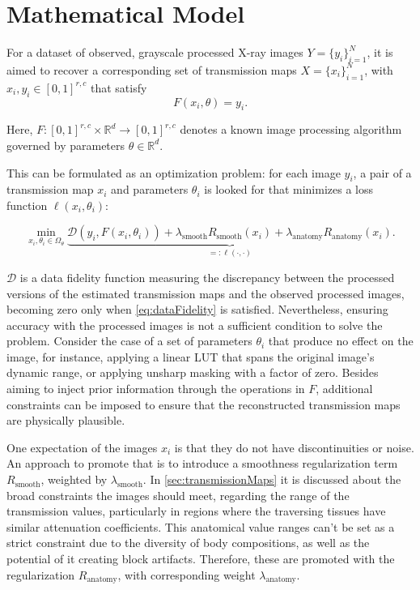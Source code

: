 \documentclass[nomenclature, english, bibtex]{kththesis}
\numberwithin{listing}{chapter}
\begin{document}
\section{Mathematical Model}
\label{sec:mathematicalModel}

For a dataset of observed, grayscale processed X-ray images $Y = \{y_i\}^N_{i=1}$, it is aimed to recover a corresponding
set of transmission maps $X = \{x_i\}^N_{i=1}$, with $x_i, y_i \in [0, 1]^{r, c}$ that satisfy
\begin{equation}
    \label{eq:dataFidelity}
    F(x_i, \theta) = y_i.
\end{equation}

Here, $F:[0,1]^{r, c} \times \mathbb{R}^d \to [0, 1]^{r, c}$ denotes a known image processing algorithm governed by
parameters $\theta \in \mathbb{R}^d$.

This can be formulated as an optimization problem: for each image $y_i$, a pair of a transmission map $x_i$ and parameters $\theta_i$ is looked for that minimizes a loss function $\ell(x_i, \theta_i)$:

\begin{equation}
    \label{eq:optimizationProblem}
    \min_{x_i, \theta_i \in \Omega_\theta}  \underbrace{\mathcal{D}(y_i, F(x_i, \theta_i)) + \lambda_{\text{smooth}} R_{\text{smooth}}(x_i) + \lambda_{\text{anatomy}} R_{\text{anatomy}}(x_i)}_{=: \ell(\cdot, \cdot)}.
\end{equation}

$\mathcal{D}$ is a data fidelity function measuring the discrepancy between the processed versions of
the estimated transmission maps and the observed processed images, becoming zero only when \autoref{eq:dataFidelity}
is satisfied. Nevertheless, ensuring accuracy with the processed images is not a sufficient condition to solve the
problem. Consider the case of a set of parameters $\theta_i$ that produce no effect on the image, for instance,
applying a linear \acrshort{LUT} that spans the original image's dynamic range, or applying unsharp masking
with a factor of zero. Besides aiming to inject prior information through the operations in $F$, additional
constraints can be imposed to ensure that the reconstructed transmission maps are physically plausible.

One expectation of the images $x_i$ is that they do not have discontinuities or noise. An approach to promote that is
to introduce a smoothness regularization term $R_{\text{smooth}}$, weighted by $\lambda_{\text{smooth}}$.
In \autoref{sec:transmissionMaps} it is discussed about the broad constraints the images should meet, regarding
the range of the transmission values, particularly in regions where the traversing tissues have similar attenuation
coefficients. This anatomical value ranges can't be set as a strict constraint due to the diversity of body compositions,
as well as the potential of it creating block artifacts. Therefore, these are promoted with the regularization
$R_{\text{anatomy}}$, with corresponding weight $\lambda_{\text{anatomy}}$.
\end{document}
